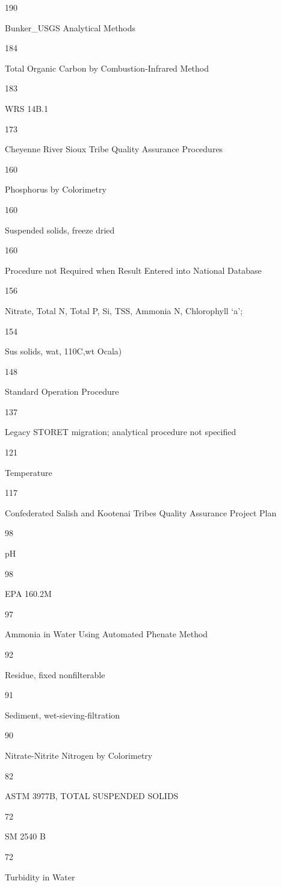 \documentclass[]{article}
\begin{document}
190

Bunker\_USGS Analytical Methods

184

Total Organic Carbon by Combustion-Infrared Method

183

WRS 14B.1

173

Cheyenne River Sioux Tribe Quality Assurance Procedures

160

Phosphorus by Colorimetry

160

Suspended solids, freeze dried

160

Procedure not Required when Result Entered into National Database

156

Nitrate, Total N, Total P, Si, TSS, Ammonia N, Chlorophyll `a';

154

Sus solids, wat, 110C,wt Ocala)

148

Standard Operation Procedure

137

Legacy STORET migration; analytical procedure not specified

121

Temperature

117

Confederated Salish and Kootenai Tribes Quality Assurance Project Plan

98

pH

98

EPA 160.2M

97

Ammonia in Water Using Automated Phenate Method

92

Residue, fixed nonfilterable

91

Sediment, wet-sieving-filtration

90

Nitrate-Nitrite Nitrogen by Colorimetry

82

ASTM 3977B, TOTAL SUSPENDED SOLIDS

72

SM 2540 B

72

Turbidity in Water
\end{document}
